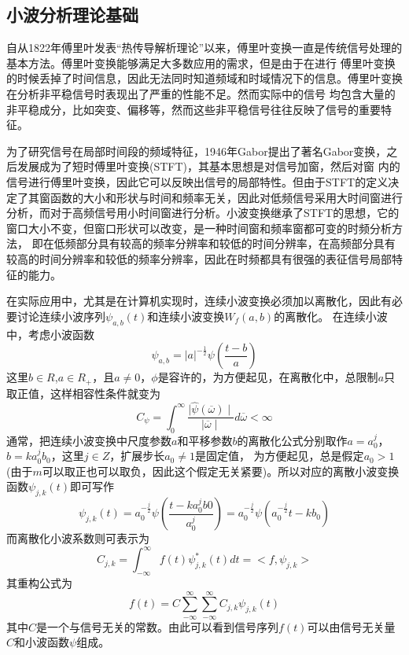 \subsection{小波分析理论基础}
自从1822年傅里叶发表“热传导解析理论”以来，傅里叶变换一直是传统信号处理的基本方法。傅里叶变换能够满足大多数应用的需求，但是由于在进行
傅里叶变换的时候丢掉了时间信息，因此无法同时知道频域和时域情况下的信息。傅里叶变换在分析非平稳信号时表现出了严重的性能不足。然而实际中的信号
均包含大量的非平稳成分，比如突变、偏移等，然而这些非平稳信号往往反映了信号的重要特征。
\par 为了研究信号在局部时间段的频域特征，1946年Gabor提出了著名Gabor变换，之后发展成为了短时傅里叶变换(STFT)，其基本思想是对信号加窗，然后对窗
内的信号进行傅里叶变换，因此它可以反映出信号的局部特性。但由于STFT的定义决定了其窗函数的大小和形状与时间和频率无关，因此对低频信号采用大时间窗进行
分析，而对于高频信号用小时间窗进行分析。小波变换继承了STFT的思想，它的窗口大小不变，但窗口形状可以改变，是一种时间窗和频率窗都可变的时频分析方法， 
即在低频部分具有较高的频率分辨率和较低的时间分辨率，在高频部分具有较高的时间分辨率和较低的频率分辨率，因此在时频都具有很强的表征信号局部特征的能力。
\par 在实际应用中，尤其是在计算机实现时，连续小波变换必须加以离散化，因此有必要讨论连续小波序列$\psi_{a,b}(t)$和连续小波变换$W_{f}(a,b)$的离散化。
在连续小波中，考虑小波函数
\begin{equation}
	\psi_{a,b}=|a|^{-\frac{1}{2}}\psi(\frac{t-b}{a})
\end{equation}
这里$b\in R$,$a\in R_{+}$，且$a\neq0$，$\phi$是容许的，为方便起见，在离散化中，总限制$a$只取正值，这样相容性条件就变为
\begin{equation}
	C_{\psi}=\int^{\infty}_{0}\frac{\mid \widehat{\psi}(\overline{\omega})\mid}{\mid \overline{\omega}\mid}d\overline{\omega} < \infty
\end{equation}
通常，把连续小波变换中尺度参数$a$和平移参数$b$的离散化公式分别取作$a=a_{0}^{j}$，$b=ka_{0}^{j}b_{0}$，这里$j\in Z$，扩展步长$a_{0}\neq 1$是固定值，
为方便起见，总是假定$a_{0}>1$(由于$m$可以取正也可以取负，因此这个假定无关紧要)。所以对应的离散小波变换函数$\psi_{j,k}(t)$即可写作
\begin{equation}
	\psi_{j,k}(t)=a^{-\frac{j}{2}}_{0}\psi(\frac{t-ka_{0}^{j}b0}{a_{0}^{j}})=a_{0}^{-\frac{j}{2}}\psi(a_{0}^{-\frac{j}{2}}t-kb_{0})
\end{equation}
而离散化小波系数则可表示为
\begin{equation}
	C_{j,k}=\int_{-\infty}^{\infty}f(t)\psi_{j,k}^{*}(t)dt=<f,\psi_{j,k}>
\end{equation}
其重构公式为
\begin{equation}
	f(t)=C\sum_{-\infty}^{\infty}\sum_{-\infty}^{\infty}C_{j,k}\psi_{j,k}(t)
\end{equation}
其中$C$是一个与信号无关的常数。由此可以看到信号序列$f(t)$可以由信号无关量$C$和小波函数$\psi$组成。
